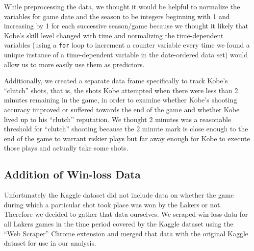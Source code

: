 \documentclass[paper=a4, fontsize=11pt]{scrartcl} %
\numberwithin{equation}{section} %
\numberwithin{figure}{section} %
\numberwithin{table}{section} %
\begin{document}
	\hspace*{1cm}While preprocessing the data, we thought it would be helpful to normalize the variables for game date and the season to be integers beginning with 1 and increasing by 1 for each successive season/game because we thought it likely that Kobe's skill level changed with time and normalizing the time-dependent variables (using a \texttt{for} loop to increment a counter variable every time we found a unique instance of a time-dependent variable in the date-ordered data set) would allow us to more easily use them as predictors.

	\hspace*{1cm}Additionally, we created a separate data frame specifically to track Kobe's ``clutch'' shots, that is, the shots Kobe attempted when there were less than 2 minutes remaining in the game, in order to examine whether Kobe's shooting accuracy improved or suffered towards the end of the game and whether Kobe lived up to his ``clutch'' reputation. We thought 2 minutes was a reasonable threshold for ``clutch'' shooting because the 2 minute mark is close enough to the end of the game to warrant riskier plays but far away enough for Kobe to execute those plays and actually take some shots. 
	\subsection{Addition of Win-loss Data}
	\hspace*{1cm}Unfortunately the Kaggle dataset did not include data on whether the game during which a particular shot took place was won by the Lakers or not. Therefore we decided to gather that data ourselves. We scraped win-loss data for all Lakers games in the time period covered by the Kaggle dataset using the ``Web Scraper'' Chrome extension and merged that data with the original Kaggle dataset for use in our analysis.
\end{document}
